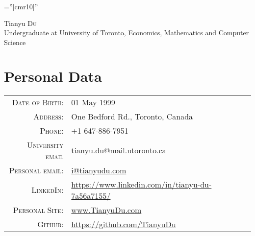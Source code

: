 \documentclass[a4paper,10pt]{article}
\begin{document}

\pagestyle{empty} %

\font\fb=''[cmr10]'' %

\par{\centering
		{\Huge Tianyu \textsc{Du} \\
		\small Undergraduate at University of Toronto, Economics, Mathematics and Computer Science
	}\bigskip\par}

\section{Personal Data}

\begin{tabular}{rl}
    \textsc{Date of Birth:} & 01 May 1999 \\
    \textsc{Address:} & One Bedford Rd., Toronto, Canada \\
    \textsc{Phone:} & +1 647-886-7951\\
    \textsc{University email} & \href{mailto:tianyu.du@mail.utoronto.ca}{tianyu.du@mail.utoronto.ca} \\
    \textsc{Personal email:} & \href{mailto:i@tianyudu.com}{i@tianyudu.com} \\
    \textsc{LinkedIn:} & \href{https://www.linkedin.com/in/tianyu-du-7a56a7155/}{https://www.linkedin.com/in/tianyu-du-7a56a7155/} \\
    \textsc{Personal Site:} & \href{www.tianyudu.com}{www.TianyuDu.com} \\
    \textsc{Github:} & \href{https://github.com/TianyuDu}{https://github.com/TianyuDu}
\end{tabular}
\end{document}
